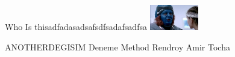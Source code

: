\documentclass{exam}
\begin{document}
\begin{questions}
\question Who Is thisadfadasadsafsdfsadafsadfsa\newline
\includegraphics[height=3em]{rendroy2.jpg} \newline
\begin{oneparchoices}
\choice ANOTHERDEGISIM
\choice Deneme Method
\choice Rendroy
\choice Amir Tocha
\end{oneparchoices}
\end{questions}
\end{document}
